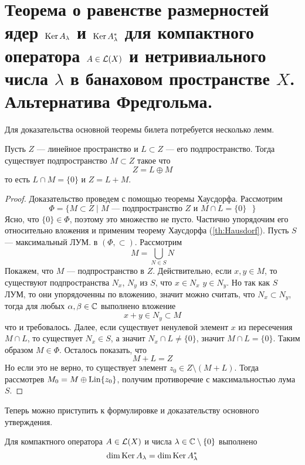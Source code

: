 \newpage
\section{Теорема о равенстве размерностей ядер $\operatorname{Ker} A_\lambda$ и $\operatorname{Ker} A^*_\lambda$ для компактного оператора $A \in \mathcal{L}(X)$ и нетривиального числа $\lambda$ в банаховом пространстве $X$. Альтернатива Фредгольма.}
Для доказательства основной теоремы билета потребуется несколько лемм. 
\begin{lemma}\label{lem:41-1}
	Пусть $Z$ --- линейное пространство и $L \subset Z$ --- его подпространство. Тогда существует подпространство $M \subset Z$ такое что 
	$$
	Z = L \oplus M 
	$$
	то есть $L \cap M = \{0\}$ и $Z = L + M$.
\end{lemma}
\begin{proof}
	Доказательство проведем с помощью теоремы Хаусдорфа. Рассмотрим 
	$$
	\Phi = \{M \subset Z \mid M \text{ --- подпространство $Z$ и $M \cap L = \{0\}$ }\}
	$$
	Ясно, что $\{0\} \in \Phi$, поэтому это множество не пусто. Частично упорядочим его относительно вложения и применим теорему Хаусдорфа (\ref{th:Hausdorf}). Пусть $S$ --- максимальный ЛУМ. в $(\Phi, \subset)$. Рассмотрим 
	$$
	M = \bigcup_{N \in S} N 
	$$
	Покажем, что $M$ --- подпространство в $Z$. Действительно, если $x, y \in M$, то существуют подпространства $N_x$, $N_y$ из $S$, что $x\in N_x$ $y \in N_y$. Но так как $S$ ЛУМ, то они упорядоченны по вложению, значит можно считать, что $N_x \subset N_y$, тогда для любых $\alpha, \beta \in \mathbb{C}$ выполнено вложение 
	$$x + y \in N_y \subset M$$
	что и требовалось. Далее, если существует ненулевой элемент $x$ из пересечения $M \cap L$, то существует $N_x \in S$, а значит $N_x \cap L \neq \{0\}$, значит $M \cap L = \{0\}$. Таким образом $M \in \Phi$. Осталось показать, что 
	$$
	M + L = Z
	$$
	Но если это не верно, то существует элемент $z_0 \in Z \setminus (M + L)$. Тогда рассмотрев $M_0 = M \oplus \operatorname{Lin} \{z_0\}$, получим противоречие с максимальностью лума $S$. 
\end{proof}
Теперь можно приступить к формулировке и доказательству основного утверждения. 
\begin{theorem}
	Для компактного оператора $A \in \mathcal{L}(X)$ и числа $\lambda \in \mathbb{C} \setminus \{0\}$ выполнено 
	$$
	\dim \operatorname{Ker} A_\lambda = \dim \operatorname{Ker} A^*_\lambda
	$$
\end{theorem}
